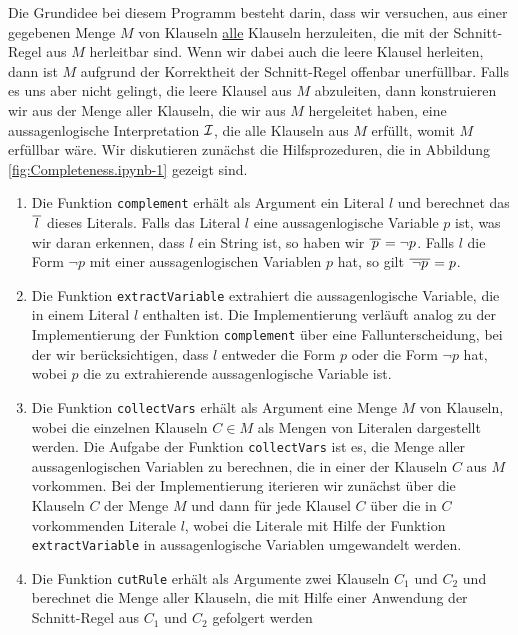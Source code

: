 Die Grundidee
bei diesem Programm besteht darin, dass wir versuchen, aus einer gegebenen Menge $M$ von Klauseln
\underline{alle} Klauseln herzuleiten, die mit der Schnitt-Regel aus $M$ herleitbar sind.  Wenn wir dabei auch
die leere Klausel herleiten, dann ist $M$ aufgrund der Korrektheit der Schnitt-Regel offenbar
unerfüllbar.  Falls es uns aber nicht gelingt, die leere Klausel aus $M$ abzuleiten, dann konstruieren wir
aus der Menge aller Klauseln, die wir aus $M$ hergeleitet haben, eine aussagenlogische Interpretation
$\mathcal{I}$, die alle Klauseln aus $M$ erfüllt, womit $M$ erfüllbar wäre.
Wir diskutieren zunächst die Hilfsprozeduren, die in Abbildung \ref{fig:Completeness.ipynb-1} gezeigt
sind. 
\begin{enumerate}
\item Die Funktion \texttt{complement} erhält als Argument ein Literal $l$ und berechnet das
       $\overline{\,l\,}$ dieses Literals.
      Falls das Literal $l$ eine aussagenlogische Variable $p$ ist, was wir daran erkennen, dass $l$ ein String
      ist, so haben wir $\overline{\,p\,} = \neg p$.
      Falls $l$ die Form $\neg p$ mit einer aussagenlogischen Variablen $p$ hat, so gilt $\overline{\,\neg p\,} =
      p$.
\item Die Funktion \texttt{extractVariable} extrahiert die aussagenlogische Variable, die in einem Literal $l$
      enthalten ist.  Die Implementierung verläuft analog zu der Implementierung der Funktion \linebreak
      \texttt{complement} über eine Fallunterscheidung, bei der wir berücksichtigen, dass $l$ entweder die Form
      $p$ oder die Form $\neg p$ hat, wobei $p$ die zu extrahierende aussagenlogische Variable ist.
\item Die Funktion \texttt{collectVars} erhält als Argument eine Menge $M$ von Klauseln, wobei die
      einzelnen Klauseln  \mbox{$C \!\in\! M$} als Mengen von Literalen dargestellt werden.  Die Aufgabe der
      Funktion \texttt{collectVars} ist es, die Menge aller aussagenlogischen Variablen zu
      berechnen, die in einer der Klauseln $C$ aus $M$ vorkommen.  Bei der Implementierung iterieren
      wir zunächst über die Klauseln $C$ der Menge $M$ und dann für jede Klausel $C$ über die in $C$
      vorkommenden Literale $l$, wobei die Literale mit Hilfe der Funktion \texttt{extractVariable} in
      aussagenlogische Variablen umgewandelt werden.
\item Die Funktion \texttt{cutRule} erhält als Argumente zwei Klauseln $C_1$ und $C_2$ und berechnet
      die Menge aller Klauseln, die mit Hilfe einer Anwendung der Schnitt-Regel aus $C_1$ und $C_2$ gefolgert werden

\end{enumerate}
